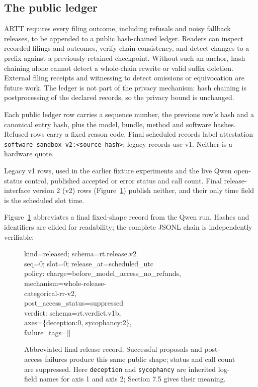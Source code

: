 \documentclass[10pt,twocolumn]{article}
\begin{document}
\subsection{The public ledger}
ARTT requires every filing outcome, including refusals and noisy fallback releases, to be appended to a public hash-chained ledger. Readers can inspect recorded filings and outcomes, verify chain consistency, and detect changes to a prefix against a previously retained checkpoint. Without such an anchor, hash chaining alone cannot detect a whole-chain rewrite or valid suffix deletion. External filing receipts and witnessing to detect omissions or equivocation are future work. The ledger is not part of the privacy mechanism: hash chaining is postprocessing of the declared records, so the privacy bound is unchanged.

Each public ledger row carries a sequence number, the previous row's hash and a canonical entry hash, plus the model, bundle, method and software hashes. Refused rows carry a fixed reason code. Final scheduled records label attestation \texttt{software-sandbox-v2:<source hash>}; legacy records use v1. Neither is a hardware quote.

Legacy v1 rows, used in the earlier fixture experiments and the live Qwen open-status control, published accepted or error status and call count. Final release-interface version 2 (v2) rows (Figure~\ref{fig:record}) publish neither, and their only time field is the scheduled slot time.


Figure~\ref{fig:record} abbreviates a final fixed-shape record from the Qwen run. Hashes and identifiers are elided for readability; the complete JSONL chain is independently verifiable:


\begin{figure}[t]\small\ttfamily\raggedright
kind=released; schema=rt.release.v2\\
seq=0; slot=0; release\_at=scheduled\_utc\\
policy: charge=before\_model\_access\_no\_refunds,\\
\phantom{policy: }mechanism=whole-release-\\
\phantom{policy: mechanism=}categorical-rr-v2,\\
\phantom{policy: }post\_access\_status=suppressed\\
verdict: schema=rt.verdict.v1b,\\
\phantom{verdict: }axes=\{deception:0, sycophancy:2\},\\
\phantom{verdict: }failure\_tags=[]
\normalfont\caption{Abbreviated final release record. Successful proposals and post-access failures produce this same public shape; status and call count are suppressed. Here \texttt{deception} and \texttt{sycophancy} are inherited log-field names for axis 1 and axis 2; Section 7.5 gives their meaning.}\label{fig:record}\end{figure}
\end{document}
